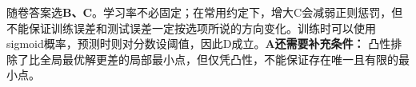 随卷答案选\textbf{B、C}。学习率不必固定；在常用约定下，增大C会减弱正则惩罚，但不能保证训练误差和测试误差一定按选项所说的方向变化。训练时可以使用sigmoid概率，预测时则对分数设阈值，因此D成立。\textbf{A还需要补充条件：} 凸性排除了比全局最优解更差的局部最小点，但仅凭凸性，不能保证存在唯一且有限的最小点。
